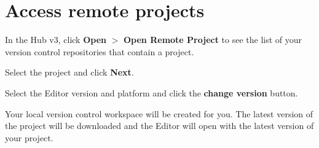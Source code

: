 \chapter{Access remote projects}
\hypertarget{md__library_2_package_cache_2com_8unity_8collab-proxy_0d2_83_81_2_documentation_0i_2_access_remote_projects}{}\label{md__library_2_package_cache_2com_8unity_8collab-proxy_0d2_83_81_2_documentation_0i_2_access_remote_projects}
\label{md__library_2_package_cache_2com_8unity_8collab-proxy_0d2_83_81_2_documentation_0i_2_access_remote_projects_autotoc_md127}%
%

\begin{DoxyEnumerate}
\item In the  Hub v3, click {\bfseries{Open}} \texorpdfstring{$>$}{>} {\bfseries{Open Remote Project}} to see the list of your version control repositories that contain a  project.
\item Select the project and click {\bfseries{Next}}.
\item Select the Editor version and platform and click the {\bfseries{change version}} button.
\item Your local version control workspace will be created for you. The latest version of the project will be downloaded and the Editor will open with the latest version of your  project. 
\end{DoxyEnumerate}